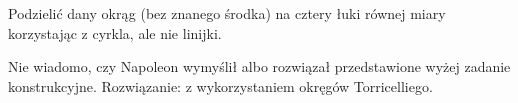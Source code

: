 \color{red}

\begin{problem}
	Podzielić dany okrąg (bez znanego środka) na cztery łuki równej miary korzystając z cyrkla, ale nie linijki.
\end{problem}

Nie wiadomo, czy Napoleon wymyślił albo rozwiązał przedstawione wyżej zadanie konstrukcyjne.
Rozwiązanie: \cite[s. 116]{neugebauer} z wykorzystaniem okręgów Torricelliego.
%




\color{black}